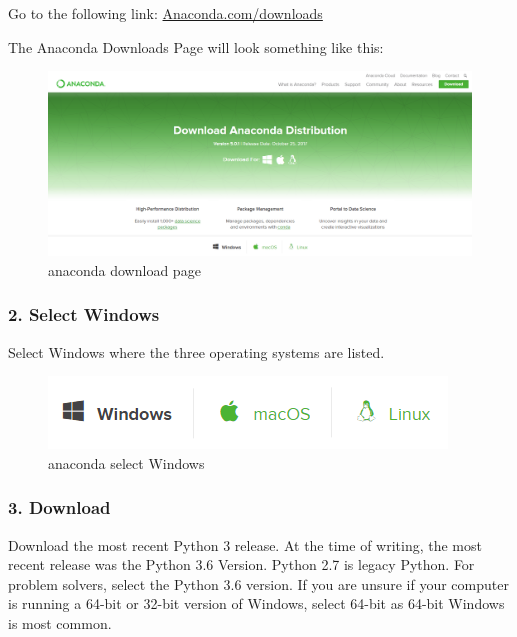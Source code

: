 \documentclass{book}
\makeatletter
\def\maxwidth{\ifdim\Gin@nat@width>\linewidth\linewidth
    \else\Gin@nat@width\fi}
\let\Oldincludegraphics\includegraphics
\renewcommand{\includegraphics}[1]{\Oldincludegraphics[width=.8\maxwidth]{#1}}
\makeatother
\begin{document}
Go to the following link:
\href{https://www.anaconda.com/download/}{Anaconda.com/downloads}

The Anaconda Downloads Page will look something like this:

\begin{figure}
\centering
\includegraphics{images/anaconda_download_page.png}
\caption{anaconda download page}
\end{figure}
    




    
        \subsubsection{2. Select Windows}\label{select-windows}

Select Windows where the three operating systems are listed.

\begin{figure}
\centering
\includegraphics{images/anaconda_select_windows.png}
\caption{anaconda select Windows}
\end{figure}
    




    
        \subsubsection{3. Download}\label{download}

Download the most recent Python 3 release. At the time of writing, the
most recent release was the Python 3.6 Version. Python 2.7 is legacy
Python. For problem solvers, select the Python 3.6 version. If you are
unsure if your computer is running a 64-bit or 32-bit version of
Windows, select 64-bit as 64-bit Windows is most common.
\end{document}

